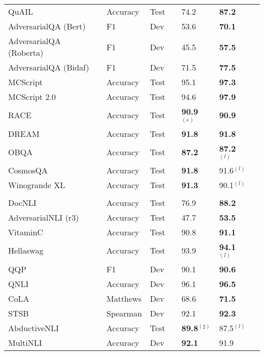\documentclass[10pt]{article}
\begin{document}
\begin{center}
\begin{longtable}{lllllll}
    QuAIL & Accuracy & Test & \citeauthor{khashabi2022unifiedqa} & 74.2 & \textbf{87.2}\\ 
    AdversarialQA (Bert) & F1 & Dev &  \citeauthor{khashabi2022unifiedqa} & 53.6 & \textbf{70.1}\\
    AdversarialQA (Roberta) & F1 & Dev & \citeauthor{khashabi2022unifiedqa} & 45.5 & \textbf{57.5} \\
    AdversarialQA (Bidaf) & F1 & Dev & \citeauthor{khashabi2020unifiedqa} & 71.5 & \textbf{77.5}\\
    MCScript & Accuracy & Test & \citeauthor{khashabi2022unifiedqa} & 95.1 & \textbf{97.3} \\
    MCScript 2.0 & Accuracy & Test & \citeauthor{khashabi2022unifiedqa} & 94.6 & \textbf{97.9} \\ 
       RACE & Accuracy & Test &    \citeauthor{shoeybi2019megatron}  &\textbf{90.9}$^{(e)}$  & \textbf{90.9} \\ 
        DREAM & Accuracy & Test & \citeauthor{wan2020multi} & \textbf{91.8} & \textbf{91.8 }\\
          OBQA & Accuracy & Test & \citeauthor{khashabi2020unifiedqa}  & \textbf{87.2} & \textbf{87.2}$^{(l)}$\\
         CosmosQA & Accuracy & Test & \citeauthor{lourie2021unicorn}  &\textbf{91.8} & 91.6$^{(l)}$  \\
         Winogrande XL & Accuracy & Test & \citeauthor{lourie2021unicorn} & \textbf{91.3} & 90.1$^{(l)}$\\
    \\
        DocNLI & Accuracy & Test &\citeauthor{qin2022nlp} & 76.9 & \textbf{88.2} \\
    AdversarialNLI (r3) & Accuracy & Test & \citeauthor{wang2020infobert}  & 47.7 & \textbf{53.5}  \\
    VitaminC & Accuracy & Test & \citeauthor{schuster2021get}  & 90.8 & \textbf{91.1} \\ 
    Hellaswag & Accuracy & Test & \citeauthor{lourie2021unicorn} &  93.9 & \textbf{94.1}$^{(l)}$ \\
     QQP & F1 & Dev & \citeauthor{raffel2019exploring} & 90.1 & \textbf{90.6}\\
     QNLI & Accuracy & Dev & \citeauthor{raffel2019exploring} & 96.1 & \textbf{96.5} \\ 
     CoLA & Matthews & Dev & \citeauthor{raffel2019exploring} & 68.6 & \textbf{71.5} \\
     STSB & Spearman & Dev & \citeauthor{raffel2019exploring} & 92.1 & \textbf{92.3} \\ 
       AbductiveNLI & Accuracy & Test & \citeauthor{he2020deberta} &  \textbf{89.8}$^{(\sharp)}$ & 87.5$^{(l)}$ \\
       MultiNLI & Accuracy & Dev & \citeauthor{raffel2019exploring} & \textbf{92.1} & 91.9\\ 
      

\end{longtable}
\end{center}
\end{document}
